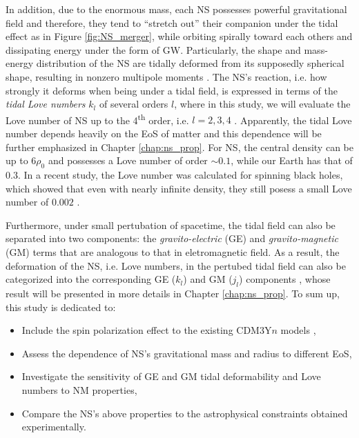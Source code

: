 In addition, due to the enormous mass, each \gls{NS} possesses powerful gravitational field and therefore, they tend to ``stretch out'' their companion under the tidal effect as in Figure \ref{fig:NS_merger}, while orbiting spirally toward each others and dissipating energy under the form of \gls{GW}. Particularly, the shape and mass-energy distribution of the \gls{NS} are tidally deformed from its supposedly spherical shape, resulting in nonzero multipole moments \cite{hinderer2008tidal,hinderer2010tidal,damour2009relativistic}. The \gls{NS}'s reaction, i.e. how strongly it deforms when being under a tidal field, is expressed in terms of the \emph{tidal Love numbers} $k_l$ of several orders $l$, where in this study, we will evaluate the Love number of \gls{NS} up to the 4\textsuperscript{th} order, i.e. $l=2,3,4$ \cite{perot2021role}. Apparently, the tidal Love number depends heavily on the \gls{EoS} of matter and this dependence will be further emphasized in Chapter \ref{chap:ns_prop}. For \gls{NS}, the central density can be up to $6\rho_0$ and possesses a Love number of order $\sim 0.1$, while our Earth has that of $0.3$. In a recent study, the Love number was calculated for spinning black holes, which showed that even with nearly infinite density, they still posess a small Love number of $0.002$ \cite{le2021spinning}.\par
Furthermore, under small pertubation of spacetime, the tidal field can also be separated into two components: the \emph{gravito-electric} (\gls{GE}) and \emph{gravito-magnetic} (\gls{GM}) terms \cite{damour2009relativistic} that are analogous to that in eletromagnetic field. As a result, the deformation of the \gls{NS}, i.e. Love numbers, in the pertubed tidal field can also be categorized into the corresponding \gls{GE} ($k_l$) and \gls{GM} ($j_l$) components \cite{perot2021role}, whose result will be presented in more details in Chapter \ref{chap:ns_prop}. To sum up, this study is dedicated to:
\begin{itemize}
        \item Include the spin polarization effect to the existing CDM3Y$n$ models \cite{tan2021equation},
        \item Assess the dependence of \gls{NS}'s gravitational mass and radius to different \gls{EoS},
        \item Investigate the sensitivity of \gls{GE} and \gls{GM} tidal deformability and Love numbers to \gls{NM} properties,
        \item Compare the \gls{NS}'s above properties to the astrophysical constraints obtained experimentally.
\end{itemize}
